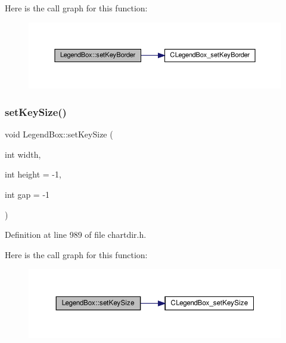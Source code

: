Here is the call graph for this function\+:
\nopagebreak
\begin{figure}[H]
\begin{center}
\leavevmode
\includegraphics[width=350pt]{class_legend_box_ab91ffd981089078d99a2d889b7a558d5_cgraph}
\end{center}
\end{figure}
\mbox{\label{class_legend_box_adad08984cc9c64053d56fa9c5a7de46d}} 
\subsubsection{\texorpdfstring{set\+Key\+Size()}{setKeySize()}}
{\footnotesize\ttfamily void Legend\+Box\+::set\+Key\+Size (\begin{DoxyParamCaption}\item[{int}]{width,  }\item[{int}]{height = {\ttfamily -\/1},  }\item[{int}]{gap = {\ttfamily -\/1} }\end{DoxyParamCaption})\hspace{0.3cm}{\ttfamily [inline]}}



Definition at line 989 of file chartdir.\+h.

Here is the call graph for this function\+:
\nopagebreak
\begin{figure}[H]
\begin{center}
\leavevmode
\includegraphics[width=350pt]{class_legend_box_adad08984cc9c64053d56fa9c5a7de46d_cgraph}
\end{center}
\end{figure}
\mbox{\label{class_legend_box_a800bcc36918eda6b0c38eef97086c0a8}} 
